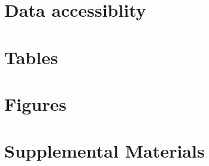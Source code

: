 \documentclass[12pt]{article}
\begin{document}
\section*{Data accessiblity}


\newpage





\section*{Tables}




\section*{Figures}

\newpage
\begin{figure}[h!]
  \begin{center}
    \caption{}
    \label{fig:}
  \end{center}
\end{figure}










\clearpage
\newcommand{\beginsupplement}{%
        \setcounter{table}{0}
        \renewcommand{\thetable}{S\arabic{table}}%
        \setcounter{figure}{0}
        \renewcommand{\thefigure}{S\arabic{figure}}%
        }

\beginsupplement
\section*{Supplemental Materials}
\end{document}
